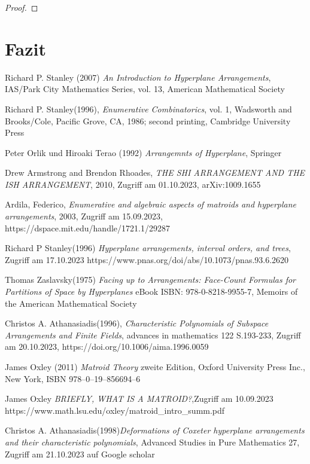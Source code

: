 \documentclass[12pt]{article}%
\theoremstyle{examplestyle}
\theoremstyle{examplestyle}
\theoremstyle{examplestyle}
\theoremstyle{examplestyle}
\theoremstyle{examplestyle}
\theoremstyle{examplestyle}
\begin{document}
\begin{proof}
 
\end{proof}


\section{Fazit}




\newpage
\thispagestyle{empty}

\begin{thebibliography}{9}
  Richard P. Stanley (2007) \emph{An Introduction to Hyperplane Arrangements}, IAS/Park City Mathematics Series, vol. 13, American Mathematical Society

  Richard P. Stanley(1996), \emph{Enumerative Combinatorics}, vol. 1, Wadsworth and Brooks/Cole,
Pacific Grove, CA, 1986; second printing, Cambridge University Press 

  Peter Orlik und Hiroaki Terao (1992) \emph{Arrangemnts of Hyperplane}, Springer

  Drew Armstrong and Brendon Rhoades, \emph{THE SHI ARRANGEMENT AND THE ISH ARRANGEMENT}, 2010, Zugriff am 01.10.2023,
  arXiv:1009.1655

  Ardila, Federico, \emph{Enumerative and algebraic aspects of matroids and hyperplane arrangements}, 2003, Zugriff am 15.09.2023,
  https://dspace.mit.edu/handle/1721.1/29287

  Richard P Stanley(1996) \emph{Hyperplane arrangements, interval orders, and trees}, Zugriff am 17.10.2023
  https://www.pnas.org/doi/abs/10.1073/pnas.93.6.2620

  Thomas Zaslavsky(1975) \emph{Facing up to Arrangements: Face-Count Formulas for Partitions of Space by Hyperplanes}
  eBook ISBN: 978-0-8218-9955-7, Memoirs of the American Mathematical Society

  Christos A. Athanasiadis(1996), \emph{Characteristic Polynomials of Subspace Arrangements and Finite Fields},
  advances in mathematics 122 S.193-233,
  Zugriff am 20.10.2023, https://doi.org/10.1006/aima.1996.0059 

  James Oxley (2011) \emph{Matroid Theory} zweite Edition, Oxford University Press Inc., New York,
  ISBN 978–0–19–856694–6

  James Oxley \emph{BRIEFLY, WHAT IS A MATROID?},Zugriff am 10.09.2023
  https://www.math.lsu.edu/\raisebox{-0.9ex}{\~{}}oxley/matroid\_intro\_summ.pdf

  Christos A. Athanasiadis(1998)\emph{Deformations of Coxeter hyperplane arrangements and their characteristic polynomials},
  Advanced Studies in Pure Mathematics 27, Zugriff am 21.10.2023 auf Google scholar
  
\end{thebibliography}
\end{document}
